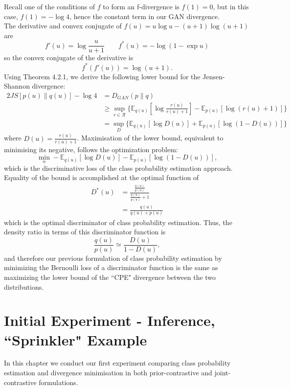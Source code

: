 \documentclass[honours,12pt]{unswthesis}
\newcommand{\E}{\mathbb{E}}
\numberwithin{equation}{section}
\theoremstyle{definition}
\begin{document}
Recall one of the conditions of $f$ to form an f-divergence is $f(1)=0$, but in this case, $f(1)=-\log 4$, hence the constant term in our GAN divergence.\\
The derivative and convex conjugate of $f(u)=u\log u-(u+1)\log (u+1)$ are
\[f'(u)=\log \frac{u}{u+1}\qquad f^*(u)=-\log (1-\exp u)\]
so the convex conjugate of the derivative is
\[f^*(f'(u))=\log (u+1).\]
Using Theorem 4.2.1, we derive the following lower bound for the Jensen-Shannon divergence:
\begin{align*}
2JS[p(u)\|q(u)]-\log 4&=D_{GAN}(p\|q)\\
&\geq \sup_{r\in \mathcal{R}}\{\mathbb{E}_{q(u)}\left[\log \frac{r(u)}{r(u)+1}\right]-\mathbb{E}_{p(u)}[\log(r(u)+1)]\}\\
&=\sup_{D}\{\E_{q(u)}[\log D(u)]+\E_{p(u)}[\log(1-D(u))]\}
\end{align*}
where $D(u)=\frac{r(u)}{r(u)+1}$. Maximisation of the lower bound, equivalent to minimising its negative, follows the optimization problem:
\[\min_\alpha -\E_{q(u)}[\log D(u)]-\E_{p(u)}[\log (1-D(u))],\]
which is the discriminative loss of the class probability estimation approach. Equality of the bound is accomplished at the optimal function of
\begin{align*}
D^*(u)&=\frac{\frac{q(u)}{p(u)}}{\frac{q(u)}{p(u)}+1}\\
&=\frac{q(u)}{q(u)+p(u)}
\end{align*}
which is the optimal discriminator of class probability estimation. Thus, the density ratio in terms of this discriminator function is 
\[\frac{q(u)}{p(u)}\simeq \frac{D(u)}{1-D(u)},\]
and therefore our previous formulation of class probability estimation by minimizing the Bernoulli loss of a discriminator function is the same as maximizing the lower bound of the ``CPE" divergence between the two distributions.
\chapter{Initial Experiment - Inference, ``Sprinkler" Example}
In this chapter we conduct our first experiment comparing class probability estimation and divergence minimisation in both prior-contrastive and joint-contrastive formulations.
\end{document}

